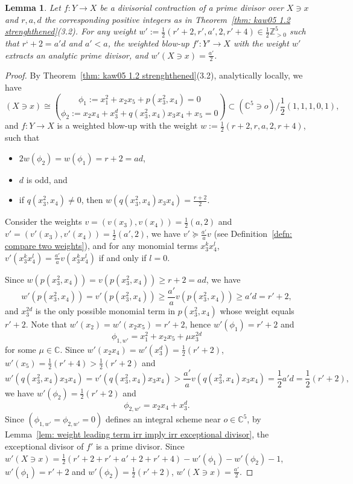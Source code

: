 \documentclass[11pt]{amsart}
\numberwithin{equation}{section}
\newcommand{\Cc}{\mathbb{C}}
\newtheorem{lem}[thm]{Lemma}
\theoremstyle{definition}
\theoremstyle{definition}
\begin{document}
\begin{lem}\label{lem: cD/2 irreducible case 2}
Let $f: Y\to X$ be a divisorial contraction of a prime divisor over $X\ni x$ and $r,a,d$ the corresponding positive integers as in Theorem~\ref{thm: kaw05 1.2 strenghthened}(3.2). For any weight $w':=\frac{1}{2}(r'+2,r',a',2,r'+4)\in\frac{1}{2}\mathbb Z_{>0}^5$ such that $r‘+2=a'd$ and $a'<a$, the weighted blow-up $f':Y'\to X$ with the weight $w'$ extracts an analytic prime divisor, and $w'(X\ni x)=\frac{a'}{2}$. 
\end{lem}

\begin{proof}
By Theorem~\ref{thm: kaw05 1.2 strenghthened}(3.2), analytically locally, we have $$(X\ni x)\cong \binom{\phi_1:= x_1^2+x_2x_5+p(x_3^2,x_4)=0}{\phi_2:= x_2x_4+x_3^d+q(x_3^2,x_4)x_3x_4+x_5=0}\subset(\mathbb C^5\ni o)/\frac{1}{2}(1,1,1,0,1),$$ and $f: Y\to X$ is a weighted blow-up with the weight  $w:=\frac{1}{2}(r+2,r,a,2,r+4)$, such that 
\begin{itemize}
    \item $2w(\phi_2)=w(\phi_1)=r+2=ad$,
    \item $d$ is odd, and
    \item if $q(x_3^2,x_4)\not=0$, then $w(q(x_3^2,x_4)x_3x_4)=\frac{r+2}{2}$.
\end{itemize}

Consider the weights $v=(v(x_3),v(x_4))=\frac{1}{2}(a,2)$ and $v'=(v'(x_3),v'(x_4))=\frac{1}{2}(a',2)$, we have $v'\succeq \frac{a'}{a}v$ (see Definition~\ref{defn: compare two weights}), and for any monomial terms $x_3^kx_4^l$, $v'(x_3^{k}x_4^l)=\frac{a'}{a}v(x_3^{k}x_4^l)$ if and only if $l=0$. 

Since $w(p(x_3^2,x_4))=v(p(x_3^2,x_4))\geq r+2=ad$, we have $$w'(p(x_3^2,x_4))=v'(p(x_3^2,x_4))\geq \frac{a'}{a}v(p(x_3^2,x_4))\geq a'd=r'+2,$$ and $x_3^{2d}$ is the only possible monomial term in $p(x_3^2,x_4)$ whose weight equals $r'+2$. Note that $w'(x_2)=w'(x_2x_5)=r'+2$, hence $w'(\phi_1)=r'+2$ and $$\phi_{1,w'}=x_1^2+x_2x_5+\mu x_3^{2d}$$ for some $\mu\in \Cc$. Since $w'(x_2x_4)=w'(x_3^d)=\frac{1}{2}(r'+2)$, $w'(x_5)=\frac{1}{2}(r'+4)>\frac{1}{2}(r'+2)$ and $$w'(q(x_3^2,x_4)x_3x_4)=v'(q(x_3^2,x_4)x_3x_4)> \frac{a'}{a}v(q(x_3^2,x_4)x_3x_4)=\frac{1}{2}a'd=\frac{1}{2}(r'+2),$$ we have $w'(\phi_2)=\frac{1}{2}(r'+2)$ and $$\phi_{2,w'}=x_2x_4+x_3^d.$$ Since $(\phi_{1,w'}=\phi_{2,w'}=0)$ defines an integral scheme near $o\in \Cc^5$, by Lemma~\ref{lem: weight leading term irr imply irr exceptional divisor}, the exceptional divisor of $f'$ is a prime divisor. Since $w'(X\ni x)=\frac{1}{2}(r'+2+r'+a'+2+r'+4)-w'(\phi_1)-w'(\phi_2)-1$, $w'(\phi_1)=r'+2$ and $w'(\phi_2)=\frac{1}{2}(r'+2)$, $w'(X\ni x)=\frac{a'}{2}$.
\end{proof}
\end{document}

